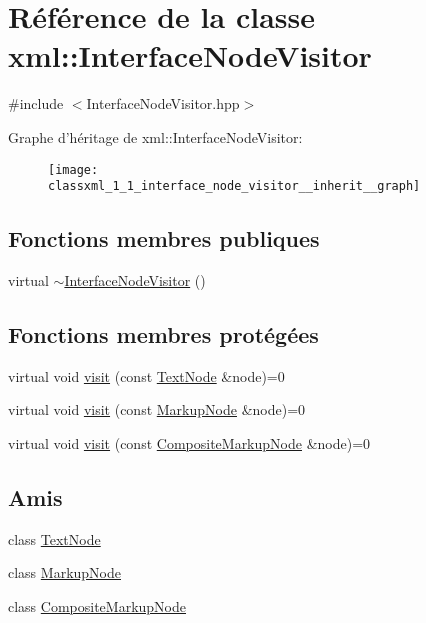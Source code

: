 \hypertarget{classxml_1_1_interface_node_visitor}{
\section{Référence de la classe xml::InterfaceNodeVisitor}
\label{classxml_1_1_interface_node_visitor}
}


{\ttfamily \#include $<$InterfaceNodeVisitor.hpp$>$}



Graphe d'héritage de xml::InterfaceNodeVisitor:
\nopagebreak
\begin{figure}[H]
\begin{center}
\leavevmode
\texttt{[image: classxml\_1\_1\_interface\_node\_visitor\_\_inherit\_\_graph]}
\end{center}
\end{figure}
\subsection*{Fonctions membres publiques}
\begin{DoxyCompactItemize}
\item 
virtual \hyperlink{classxml_1_1_interface_node_visitor_a53c5fa9a736af1450bbc3d95feffe94a}{$\sim$InterfaceNodeVisitor} ()
\end{DoxyCompactItemize}
\subsection*{Fonctions membres protégées}
\begin{DoxyCompactItemize}
\item 
virtual void \hyperlink{classxml_1_1_interface_node_visitor_a22a8a333e5cf2da1f1ac9f8f1f376a89}{visit} (const \hyperlink{classxml_1_1_text_node}{TextNode} \&node)=0
\item 
virtual void \hyperlink{classxml_1_1_interface_node_visitor_a53b33aabb8a79d4b1715c7664671d326}{visit} (const \hyperlink{classxml_1_1_markup_node}{MarkupNode} \&node)=0
\item 
virtual void \hyperlink{classxml_1_1_interface_node_visitor_afd6306ffd03380f21f436234b314c34d}{visit} (const \hyperlink{classxml_1_1_composite_markup_node}{CompositeMarkupNode} \&node)=0
\end{DoxyCompactItemize}
\subsection*{Amis}
\begin{DoxyCompactItemize}
\item 
class \hyperlink{classxml_1_1_interface_node_visitor_abd4faab11b504920cd6f8af02104143c}{TextNode}
\item 
class \hyperlink{classxml_1_1_interface_node_visitor_ac2a462e7a005c065f6778ccc0be88931}{MarkupNode}
\item 
class \hyperlink{classxml_1_1_interface_node_visitor_a8478dddac071858d6a22088eb161a690}{CompositeMarkupNode}
\end{DoxyCompactItemize}


